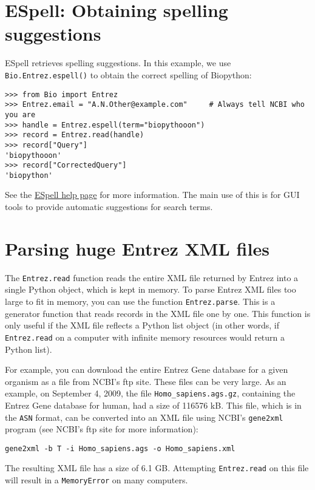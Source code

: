 \documentclass{report}
\begin{document}
\section{ESpell: Obtaining spelling suggestions}
ESpell retrieves spelling suggestions. In this example, we use \verb+Bio.Entrez.espell()+ to obtain the correct spelling of Biopython:

\begin{verbatim}
>>> from Bio import Entrez
>>> Entrez.email = "A.N.Other@example.com"     # Always tell NCBI who you are
>>> handle = Entrez.espell(term="biopythooon")
>>> record = Entrez.read(handle)
>>> record["Query"]
'biopythooon'
>>> record["CorrectedQuery"]
'biopython'
\end{verbatim}
See the \href{http://www.ncbi.nlm.nih.gov/entrez/query/static/espell\_help.html}{ESpell help page} for more information.
The main use of this is for GUI tools to provide automatic suggestions for search terms.

\section{Parsing huge Entrez XML files}

The \verb+Entrez.read+ function reads the entire XML file returned by Entrez into a single Python object, which is kept in memory. To parse Entrez XML files too large to fit in memory, you can use the function \verb+Entrez.parse+. This is a generator function that reads records in the XML file one by one. This function is only useful if the XML file reflects a Python list object (in other words, if \verb+Entrez.read+ on a computer with infinite memory resources would return a Python list).

For example, you can download the entire Entrez Gene database for a given organism as a file from NCBI's ftp site. These files can be very large. As an example, on September 4, 2009, the file \verb+Homo_sapiens.ags.gz+, containing the Entrez Gene database for human, had a size of 116576 kB. This file, which is in the \verb+ASN+ format, can be converted into an XML file using NCBI's \verb+gene2xml+ program (see NCBI's ftp site for more information):

\begin{verbatim}
gene2xml -b T -i Homo_sapiens.ags -o Homo_sapiens.xml
\end{verbatim}

The resulting XML file has a size of 6.1 GB. Attempting \verb+Entrez.read+ on this file will result in a \verb+MemoryError+ on many computers.
\end{document}
